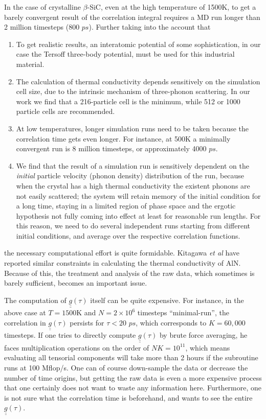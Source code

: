 In the case of crystalline $\beta$-SiC, even at the high temperature
of 1500K, to get a barely convergent result of the correlation
integral requires a MD run longer than 2 million timesteps (800 $ps$).
Further taking into the account that
\begin{enumerate}
\item To get realistic results, an interatomic potential of some
  sophistication, in our case the Tersoff three-body
  potential\cite{Tersoff}, must be used for this industrial material.
  
\item The calculation of thermal conductivity depends sensitively on
  the simulation cell size, due to the intrinsic mechanism of
  three-phonon scattering. In our work we find that a 216-particle
  cell is the minimum, while 512 or 1000 particle cells are
  recommended.
  
\item At low temperatures, longer simulation runs need to be taken
  because the correlation time gets even longer. For instance, at 500K
  a minimally convergent run is 8 million timesteps, or approximately
  4000 $ps$.
  
\item We find that the result of a simulation run is sensitively
  dependent on the {\em initial} particle velocity (phonon density)
  distribution of the run, because when the crystal has a high thermal
  conductivity the existent phonons are not easily scattered; the
  system will retain memory of the initial condition for a long time,
  staying in a limited region of phase space and the ergotic
  hypothesis not fully coming into effect at least for reasonable run
  lengths. For this reason, we need to do several independent runs
  starting from different initial conditions, and average over the
  respective correlation functions.
\end{enumerate}
the necessary computational effort is quite formidable. Kitagawa {\em
  et al}\cite{Kitagawa} have reported similar constraints in
calculating the thermal conductivity of AlN.  Because of this, the
treatment and analysis of the raw data, which sometimes is barely
sufficient, becomes an important issue.

The computation of $\underline{\underline{g}}(\tau)$ itself can be
quite expensive. For instance, in the above case at $T=1500$K and
$N=2\times 10^6$ timesteps ``minimal-run'', the correlation in
$\underline{\underline{g}}(\tau)$ persists for $\tau < 20$ $ps$, which
corresponds to $K=60,000$ timesteps. If one tries to directly compute
$\underline{\underline{g}}(\tau)$ by brute force averaging, he faces
multiplication operations on the order of $NK=10^{11}$, which means
evaluating all tensorial components will take more than 2 hours if the
subroutine runs at 100 Mflop/s.  One can of course down-sample the
data or decrease the number of time origins, but getting the raw data
is even a more expensive process that one certainly does not want to
waste any information here. Furthermore, one is not sure what the
correlation time is beforehand, and wants to see the entire
$\underline{\underline{g}}(\tau)$.

